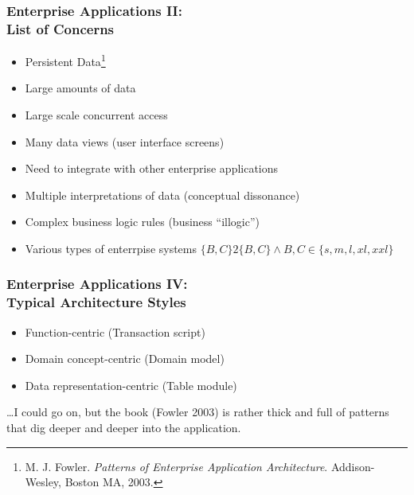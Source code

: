 \documentclass[10pt]{beamer}
\begin{document}
\begin{frame}[t]
\frametitle{Enterprise Applications II:\\List of Concerns}
\begin{itemize}
\item Persistent Data\footnote{M. J. Fowler. \emph{Patterns of Enterprise Application Architecture}. Addison-Wesley, Boston MA, 2003.}
\item Large amounts of data
\item Large scale concurrent access
\item Many data views (user interface screens)
\item Need to integrate with other enterprise applications
\item Multiple interpretations of data (conceptual dissonance)
\item Complex business logic rules (business ``illogic'')
\item Various types of enterrpise systems $\{B,C\}2\{B,C\} \wedge B,C \in \{s,m,l,xl,xxl\}$
\end{itemize}
\end{frame}

\begin{frame}[t]
\frametitle{Enterprise Applications IV:\\Typical Architecture Styles}
\begin{itemize}
\item Function-centric (Transaction script)
\item Domain concept-centric (Domain model)
\item Data representation-centric (Table module)
\end{itemize}

\ldots I could go on, but the book (Fowler 2003) is rather thick and full of patterns that dig deeper and deeper into the application.
\end{frame}
\end{document}
